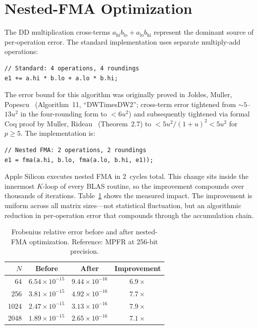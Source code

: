 \documentclass[conference]{IEEEtran}
\newcommand{\hi}{\mathrm{hi}}
\newcommand{\lo}{\mathrm{lo}}
\begin{document}
\section{Nested-FMA Optimization}
\label{sec:fma}
The DD multiplication cross-terms $a_\hi b_\lo + a_\lo b_\hi$ represent the dominant source of per-operation error. The standard implementation uses separate multiply-add operations:
%
\begin{lstlisting}[style=metal]
// Standard: 4 operations, 4 roundings
e1 += a.hi * b.lo + a.lo * b.hi;
\end{lstlisting}
%
The error bound for this algorithm was originally proved in Joldes, Muller, Popescu~\cite{Joldes2017} (Algorithm~11, ``DWTimesDW2''; cross-term error tightened from ${\sim}5$--$13u^2$ in the four-rounding form to $<6u^2$) and subsequently tightened via formal Coq proof by Muller, Rideau~\cite{MullerRideau2022} (Theorem~2.7) to $<5u^2/(1+u)^2 < 5u^2$ for $p\geq5$. The implementation is:
%
\begin{lstlisting}[style=metal]
// Nested FMA: 2 operations, 2 roundings
e1 = fma(a.hi, b.lo, fma(a.lo, b.hi, e1));
\end{lstlisting}
%
Apple Silicon executes nested FMA in 2~cycles total. This change sits inside the innermost $K$-loop of every BLAS routine, so the improvement compounds over thousands of iterations.
Table~\ref{tab:fma} shows the measured impact. The improvement is uniform across all matrix sizes---not statistical fluctuation, but an algorithmic reduction in per-operation error that compounds through the accumulation chain.
\begin{table}[t]
\centering
\caption{Frobenius relative error before and after nested-FMA optimization. Reference: MPFR at 256-bit precision.}
\label{tab:fma}
\begin{tabular}{r@{\hskip 12pt}c@{\hskip 12pt}c@{\hskip 12pt}c}
\toprule
\textbf{$N$} & \textbf{Before} & \textbf{After} & \textbf{Improvement} \\
\midrule
64   & $6.54 \times 10^{-15}$ & $9.44 \times 10^{-16}$ & $6.9\times$ \\
256  & $3.81 \times 10^{-15}$ & $4.92 \times 10^{-16}$ & $7.7\times$ \\
1024 & $2.47 \times 10^{-15}$ & $3.13 \times 10^{-16}$ & $7.9\times$ \\
2048 & $1.89 \times 10^{-15}$ & $2.65 \times 10^{-16}$ & $7.1\times$ \\
\bottomrule
\end{tabular}
\end{table}
\end{document}
